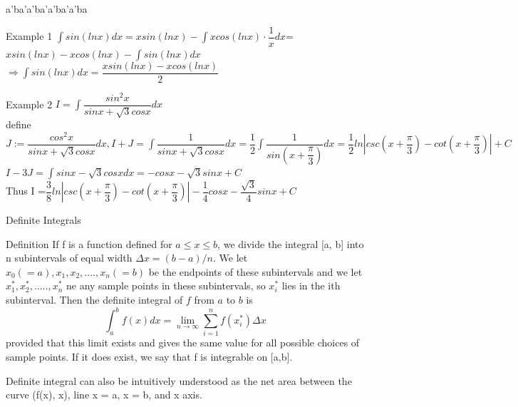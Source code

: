 \begin{frame}{a'ba'a'ba'a'ba'a'ba}
    \begin{block}{Example 1}
        $\int sin(lnx)dx=xsin(lnx)-\int xcos(lnx)\cdot\dfrac{1}{x}dx$=$xsin(lnx)-xcos(lnx)-\int sin(lnx)dx$
        $\Rightarrow\int sin(lnx)dx=\dfrac{xsin(lnx)-xcos(lnx)}{2}$
    \end{block}
    \begin{block}{Example 2}
        $I=\int \dfrac{sin^2x}{sinx+\sqrt{3}cosx}dx$\\
        define $J:=\dfrac{cos^2x}{sinx+\sqrt{3}cosx}dx,
            I+J=\int \dfrac{1}{sinx+\sqrt{3}cosx}dx=\dfrac{1}{2}\int \dfrac{1}{sin(x+\dfrac{\pi}{3})}dx=\dfrac{1}{2}ln|csc(x+\dfrac{\pi}{3})-cot(x+\dfrac{\pi}{3})|+C$\\
        $I-3J=\int sinx-\sqrt{3}cosxdx=-cosx-\sqrt{3}sinx+C$\\
        Thus I =$\dfrac{3}{8}ln|csc(x+\dfrac{\pi}{3})-cot(x+\dfrac{\pi}{3})|-\dfrac{1}{4}cosx-\dfrac{\sqrt{3}}{4}sinx+C$
    \end{block}
\end{frame}
\begin{frame}{Definite Integrals}
    \begin{block}{Definition}
        If f is a function defined for $a \leq x \leq b$, we divide the integral [a, b] into n subintervals of equal width $\Delta x = (b-a)/n$. We let $x_0(=a), x_1, x_2, ...., x_n(=b)$ be the endpoints of these subintervals and we let $x_1^*, x_2^*, .....,x_n^*$ ne any sample points in these subintervals, so $x_i^*$ lies in the ith subinterval. Then the definite integral of $f$ from $a$ to $b$ is
        \begin{equation*}
            \int_a^b f(x)dx = \lim\limits_{n \to \infty} \sum_{i = 1}^n f(x_i^*)\Delta x
        \end{equation*}
        provided that this limit exists and gives the same value for all possible choices of sample points. If it does exist, we say that f is integrable on [a,b].
    \end{block}
    Definite integral can also be intuitively understood as the net area between the curve (f(x), x), line x = a, x = b, and x axis.
\end{frame}


